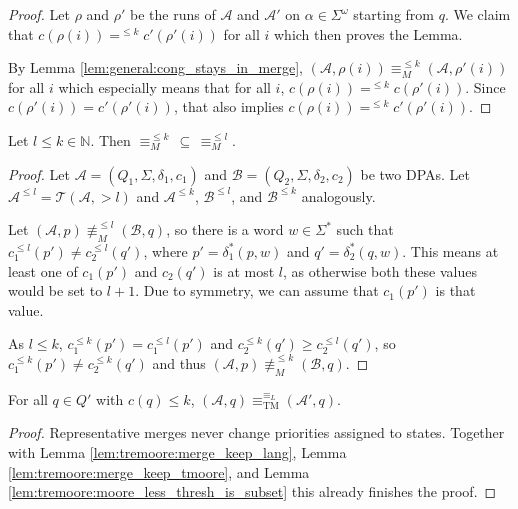 \begin{proof} 
	Let $\rho$ and $\rho'$ be the runs of $\mathcal{A}$ and $\mathcal{A}'$ on $\alpha \in \Sigma^\omega$ starting from $q$. We claim that $c(\rho(i)) =^{\leq k} c'(\rho'(i))$ for all $i$ which then proves the Lemma.
	
	By Lemma \ref{lem:general:cong_stays_in_merge}, $(\mathcal{A}, \rho(i)) \equiv_M^{\leq k} (\mathcal{A}, \rho'(i))$ for all $i$ which especially means that for all $i$, $c(\rho(i)) =^{\leq k} c(\rho'(i))$. Since $c(\rho'(i)) = c'(\rho'(i))$, that also implies $c(\rho(i)) =^{\leq k} c'(\rho'(i))$.
\end{proof}

\begin{lem}
	Let $l \leq k \in \mathbb{N}$. Then $\equiv_M^{\leq k} \,\subseteq\, \equiv_M^{\leq l}$.
	\label{lem:tremoore:moore_less_thresh_is_subset}
\end{lem}

\begin{proof}
	Let $\mathcal{A} = (Q_1, \Sigma, \delta_1, c_1)$ and $\mathcal{B} = (Q_2, \Sigma, \delta_2, c_2)$ be two DPAs. Let $\mathcal{A}^{\leq l} = \mathcal{T}(\mathcal{A}, > l)$ and $\mathcal{A}^{\leq k}$, $\mathcal{B}^{\leq l}$, and $\mathcal{B}^{\leq k}$ analogously.
	
	Let $(\mathcal{A}, p) \not\equiv_M^{\leq l} (\mathcal{B}, q)$, so there is a word $w \in \Sigma^*$ such that $c_1^{\leq l}(p') \neq c_2^{\leq l}(q')$, where $p' = \delta_1^*(p, w)$ and $q' = \delta_2^*(q, w)$. This means at least one of $c_1(p')$ and $c_2(q')$ is at most $l$, as otherwise both these values would be set to $l+1$. Due to symmetry, we can assume that $c_1(p')$ is that value.
	
	As $l \leq k$, $c_1^{\leq k}(p') = c_1^{\leq l}(p')$ and $c_2^{\leq k}(q') \geq c_2^{\leq l}(q')$, so $c_1^{\leq k}(p') \neq c_2^{\leq k}(q')$ and thus $(\mathcal{A}, p) \not\equiv_M^{\leq k} (\mathcal{B}, q)$.
\end{proof} 

\begin{lem}
	For all $q \in Q'$ with $c(q) \leq k$, $(\mathcal{A}, q) \equiv^{\equiv_L}_\text{TM} (\mathcal{A}', q)$.
	\label{lem:tremoore:merge_keep_tm}
\end{lem}

\begin{proof}
	Representative merges never change priorities assigned to states. Together with Lemma \ref{lem:tremoore:merge_keep_lang}, Lemma \ref{lem:tremoore:merge_keep_tmoore}, and Lemma \ref{lem:tremoore:moore_less_thresh_is_subset} this already finishes the proof.
\end{proof}

